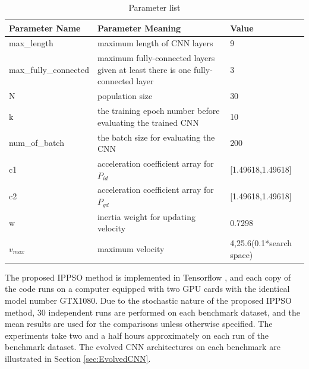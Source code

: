 \documentclass[conference]{IEEEtran}
\begin{document}
\begin{table}[!t]
	\renewcommand{\arraystretch}{1.3}
	\caption{Parameter list}
	\label{table:ParameterList}
	\centering
	\begin{tabular}{|p{2.5cm}|p{3cm}|p{2cm}|}
		\hline
		Parameter Name & Parameter Meaning & Value\\
		\hline
		max\_length & maximum length of CNN layers & 9\\
		\hline
		max\_fully\_connected & maximum fully-connected layers given at least there is one fully-connected layer & 3\\
		\hline
		N & population size & 30\\
		\hline
		k & the training epoch number before evaluating the trained CNN & 10\\
		\hline
		num\_of\_batch & the batch size for evaluating the CNN & 200\\
		\hline
		c1 & acceleration coefficient array for $P_{id}$ & [1.49618,1.49618]\\
		\hline
		c2 & acceleration coefficient array for $P_{gd}$ & [1.49618,1.49618]\\
		\hline
		w & inertia weight for updating velocity & 0.7298\\
		\hline
		$v_{max}$ & maximum velocity & 4,25.6(0.1*search space)\\
		\hline
	\end{tabular}
\end{table}

The proposed IPPSO method is implemented in Tensorﬂow \cite{Tensorfow:Abadi}, and each copy of the code runs on a computer equipped with two GPU cards with the identical model number GTX1080. Due to the stochastic nature of the proposed IPPSO method, 30 independent runs are performed on each benchmark dataset, and the mean results are used for the comparisons unless otherwise specified. The experiments take two and a half hours approximately on each run of the benchmark dataset. 
The evolved CNN architectures on each benchmark are illustrated in Section \ref{sec:EvolvedCNN}.
\end{document}
